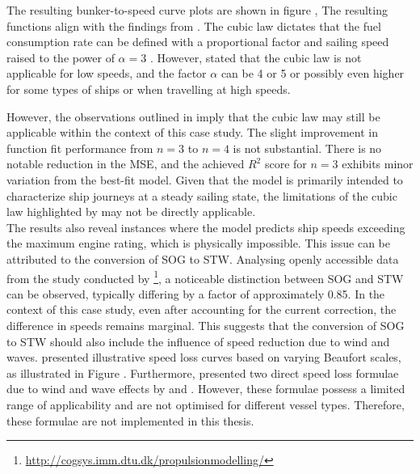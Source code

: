 The resulting bunker-to-speed curve plots are shown in figure , The resulting functions align with the findings from . The cubic law dictates that the fuel consumption rate can be defined with a proportional factor and sailing speed raised to the power of $\alpha = 3$ . However,  stated that the cubic law is not applicable for low speeds, and the factor $\alpha$ can be 4 or 5 or possibly even higher for some types of ships or when travelling at high speeds.\\ 

\pagebreak

However, the observations outlined in  imply that the cubic law may still be applicable within the context of this case study. The slight improvement in function fit performance from $n = 3$ to $n = 4$ is not substantial. There is no notable reduction in the MSE, and the achieved $R^2$ score for $n = 3$ exhibits minor variation from the best-fit model. Given that the model is primarily intended to characterize ship journeys at a steady sailing state, the limitations of the cubic law highlighted by \citet{Psaraftis.2013} may not be directly applicable.\\


The results also reveal instances where the model predicts ship speeds exceeding the maximum engine rating, which is physically impossible. This issue can be attributed to the conversion of SOG to STW. Analysing openly accessible data from the study conducted by \footnote{\url{http://cogsys.imm.dtu.dk/propulsionmodelling/}}, a noticeable distinction between SOG and STW can be observed, typically differing by a factor of approximately 0.85. In the context of this case study, even after accounting for the current correction, the difference in speeds remains marginal. This suggests that the conversion of SOG to STW should also include the influence of speed reduction due to wind and waves.  presented illustrative speed loss curves based on varying Beaufort scales, as illustrated in Figure . Furthermore,  presented two direct speed loss formulae due to wind and wave effects by  and . However, these formulae possess a limited range of applicability and are not optimised for different vessel types. Therefore, these formulae are not implemented in this thesis.\\

